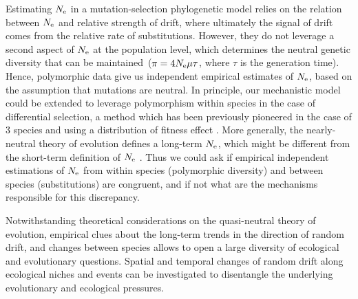 Estimating $N_{\mathrm{e}}$ in a mutation-selection phylogenetic model relies on the relation between $N_{\mathrm{e}}$ and relative strength of drift, where ultimately the signal of drift comes from the relative rate of \glspl{substitution}.
However, they do not leverage a second aspect of $N_{\mathrm{e}}$ at the population level, which determines the \gls{neutral} genetic diversity that can be maintained~($\pi=4N_{\mathrm{e}} \mu \tau$, where $\tau$ is the generation time).
Hence, \gls{polymorphic} data give us independent empirical estimates of $N_{\mathrm{e}}$, based on the assumption that mutations are \gls{neutral}.
In principle, our mechanistic model could be extended to leverage polymorphism within species in the case of differential selection, a method which has been previously pioneered in the case of $3$ species and using a distribution of fitness effect \citep{Wilson2011}.
More generally, the \gls{nearly-neutral} theory of evolution defines a long-term $N_{\mathrm{e}}$, which might be different from the short-term definition of $N_{\mathrm{e}}$ \citep{Platt2018}.
Thus we could ask if empirical independent estimations of $N_{\mathrm{e}}$ from within species (polymorphic diversity) and between species (\glspl{substitution}) are congruent, and if not what are the mechanisms responsible for this discrepancy.

Notwithstanding theoretical considerations on the quasi-neutral theory of evolution, empirical clues about the long-term trends in the direction of random drift, and changes between species allows to open a large diversity of ecological and evolutionary questions.
Spatial and temporal changes of random drift along ecological niches and events can be investigated to disentangle the underlying evolutionary and ecological pressures.

